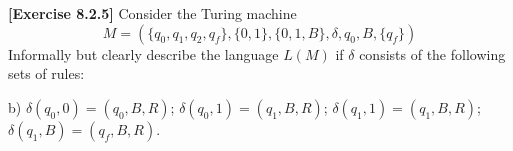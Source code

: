 \textbf{[Exercise 8.2.5]} Consider the Turing machine
$$M=(\{q_0,q_1,q_2,q_f\},\{0,1\},\{0,1,B\},\delta,q_0,B,\{q_f\})$$
Informally but clearly describe the language $L(M)$ if $\delta$ consists
of the following sets of rules:

b) $\delta(q_0,0)=(q_0,B,R)$; $\delta(q_0,1)=(q_1,B,R)$;
$\delta(q_1,1)=(q_1,B,R)$; $\delta(q_1,B)=(q_f,B,R)$.